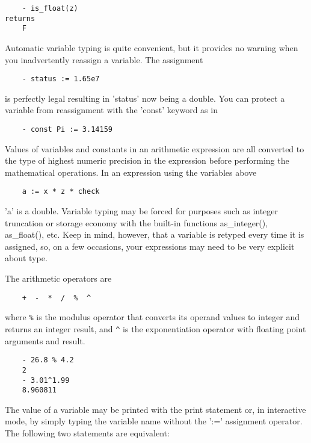 \begin{verbatim}
	- is_float(z)
returns
	F
\end{verbatim}

    Automatic variable typing is quite convenient, but it provides no
warning when you inadvertently reassign a variable.  The assignment

\begin{verbatim}
	- status := 1.65e7
\end{verbatim}

is perfectly legal resulting in 'status' now being a double.  You can
protect a variable from reassignment with the 'const' keyword as in

\begin{verbatim}
	- const Pi := 3.14159
\end{verbatim}

    Values of variables and constants in an arithmetic expression are all
converted to the type of highest numeric precision in the expression before
performing the mathematical operations.  In an expression using the
variables above

\begin{verbatim}
	a := x * z * check
\end{verbatim}

'a' is a double.  Variable typing may be forced for purposes such as
integer truncation or storage economy with the built-in functions
as\_integer(), as\_float(), etc.  Keep in mind, however, that a variable is
retyped every time it is assigned, so, on a few occasions, your expressions
may need to be very explicit about type.

    The arithmetic operators are

\begin{verbatim}
	+  -  *  /  %  ^
\end{verbatim}

where \verb!%! is the modulus operator that converts its operand values to integer
and returns an integer result, and \verb!^! is the exponentiation operator with
floating point arguments and result.

\begin{verbatim}
	- 26.8 % 4.2
	2
	- 3.01^1.99
	8.960811
\end{verbatim}

    The value of a variable may be printed with the print statement or, in
interactive mode, by simply typing the variable name without the ':='
assignment operator.  The following two statements are equivalent:

